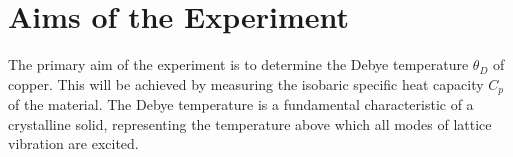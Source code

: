 \section{Aims of the Experiment}
\label{sec:aims}
The primary aim of the experiment is to determine the Debye temperature $\theta_D$ of copper. 
This will be achieved by measuring the isobaric specific heat capacity $C_p$ of the material. 
The Debye temperature is a fundamental characteristic of a crystalline solid, 
representing the temperature above which all modes of lattice vibration are excited. 